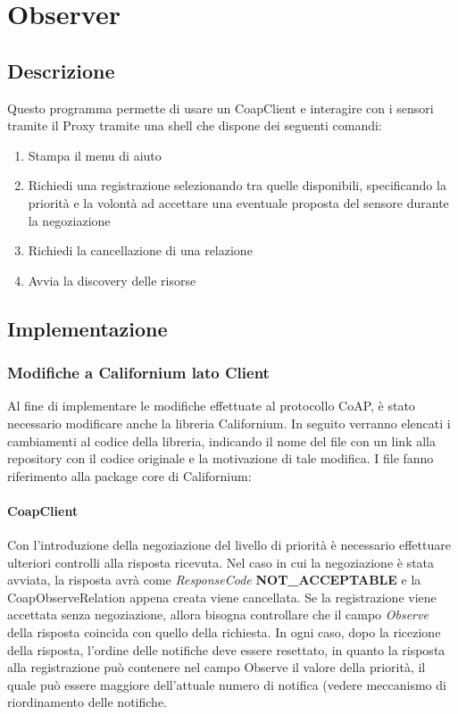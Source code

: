 \chapter{Observer}
	\section {Descrizione}
		Questo programma permette di usare un CoapClient e interagire con i sensori tramite il Proxy tramite una shell che dispone dei seguenti comandi:
		\begin{enumerate}
			\item Stampa il menu di aiuto
			\item Richiedi una registrazione selezionando tra quelle disponibili, specificando la priorità e la volontà ad accettare una eventuale proposta del sensore durante la negoziazione
			\item Richiedi la cancellazione di una relazione
			\item Avvia la discovery delle risorse
		\end{enumerate}
	\section {Implementazione}
		\subsection {Modifiche a Californium lato Client}
			Al fine di implementare le modifiche effettuate al protocollo CoAP, è stato necessario modificare anche la libreria Californium. In seguito verranno elencati i cambiamenti al codice della libreria, indicando il nome del file con un link alla repository con il codice originale e la motivazione di tale modifica. I file fanno riferimento alla package core di Californium:
			\subsubsection{CoapClient}
				Con l'introduzione della negoziazione del livello di priorità è necessario effettuare ulteriori controlli alla risposta ricevuta. Nel caso in cui la negoziazione è stata avviata, la risposta avrà come \textit{ResponseCode} \textbf{NOT\_ACCEPTABLE} e la CoapObserveRelation appena creata viene cancellata. Se la registrazione viene accettata senza negoziazione, allora bisogna controllare che il campo \textit{Observe} della risposta coincida con quello della richiesta. In ogni caso, dopo la ricezione della risposta, l'ordine delle notifiche deve essere resettato, in quanto la risposta alla registrazione può contenere nel campo Observe il valore della priorità, il quale può essere maggiore dell'attuale numero di notifica (vedere meccanismo di riordinamento delle notifiche.\newline
				
